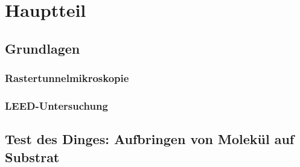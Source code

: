 \documentclass[a4paper,11pt,oneside,final,german,openbib,pdftex]{scrbook}
\begin{document}
\chapter{Hauptteil}


\section{Grundlagen}

% 
\subsection{Rastertunnelmikroskopie}

\subsection{LEED-Untersuchung}



% 
 
% 
% 

\section{Test des Dinges: Aufbringen von Molekül auf Substrat} \label{kaptest}




% 
\end{document}
